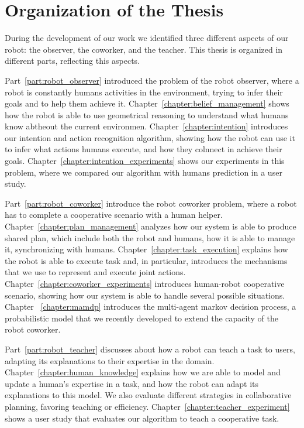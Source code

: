 \section{Organization of the Thesis}
During the development of our work we identified three different aspects of our robot: the observer, the coworker, and the teacher. This thesis is organized in different parts, reflecting this aspects.

Part~\ref{part:robot_observer} introduced the problem of the robot observer, where a robot is constantly humans activities in the environment, trying to infer their goals and to help them achieve it.  Chapter~\ref{chapter:belief_management} shows how the robot is able to use geometrical reasoning to understand what humans know abtheout the current environmen. Chapter~\ref{chapter:intention} introduces our intention and action recognition algorithm, showing how the robot can use it to infer what actions humans execute, and how they colnnect in achieve their goals. Chapter~\ref{chapter:intention_experiments} shows our experiments in this problem, where we compared our algorithm with humans prediction in a user study.

Part~\ref{part:robot_coworker} introduce the robot coworker problem, where a robot has to complete a cooperative scenario with a human helper. Chapter~\ref{chapter:plan_management} analyzes how our system is able to produce shared plan, which include both the robot and humans, how it is able to manage it, synchronizing with humans. Chapter~\ref{chapter:task_execution} explains how the robot is able to execute task and, in particular, introduces the mechanisms that we use to represent and execute joint actions. Chapter~\ref{chapter:coworker_experiments} introduces human-robot cooperative scenario, showing how our system is able to handle several possible situations. Chapter ~\ref{chapter:mamdp} introduces the multi-agent markov decision process, a probabilistic model that we recently developed to extend the capacity of the robot coworker.

Part~\ref{part:robot_teacher} discusses about how a robot can teach a task to users, adapting its explanations to their expertise in the domain. Chapter~\ref{chapter:human_knowledge} explains how we are able to model and update a human's expertise in a task, and how the robot can adapt its explanations to this model. We also evaluate different strategies in collaborative planning, favoring teaching or efficiency. Chapter~\ref{chapter:teacher_experiment} shows a user study that evaluates our algorithm to teach a cooperative task.


